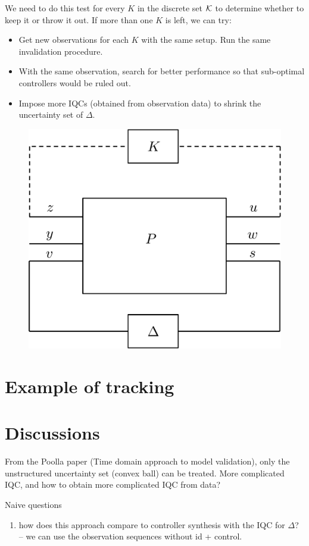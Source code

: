 \documentclass[11pt, onecolumn]{article}
\begin{document}
We need to do this test for every $K$ in the discrete set $\mathcal K$ to determine whether to keep it or
throw it out. If more than one $K$ is left, we can try:
\begin{itemize}
\item Get new observations for each $K$ with the same setup. Run the same invalidation procedure.
\item With the same observation, search for better performance so that sub-optimal controllers would
  be ruled out.
\item Impose more IQCs (obtained from observation data) to shrink the uncertainty set of $\Delta$.
\end{itemize}



\begin{figure}[h!]
  \centering
  \includegraphics[width=.3\linewidth]{sys1.pdf}
\end{figure}




\section{Example of tracking}


\section{Discussions}

From the Poolla paper (Time domain approach to model validation), only the unstructured uncertainty
set (convex ball) can be treated. More complicated IQC, and how to obtain more complicated IQC from data?


Naive questions
\begin{enumerate}
\item how does this approach compare to controller synthesis with the IQC for $\Delta$? -- we can
  use the observation sequences without id + control.
\end{enumerate}
\end{document}
